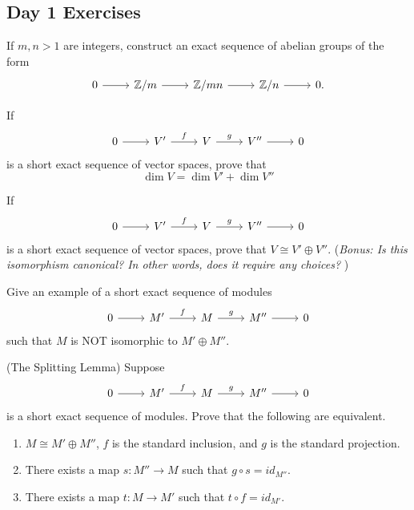 \subsection{Day 1 Exercises}
\begin{exercise}{}{} If $m,n>1$ are integers, construct an exact sequence of abelian groups of the form
\[\begin{tikzcd}
0 \ar[r] & \mathbb{Z}/m \ar[r] & \mathbb{Z}/mn \ar[r] & \mathbb{Z}/n \ar[r] & 0.
\end{tikzcd} \]
\end{exercise}
\begin{exercise}{}{} 
    If 
    \[ \begin{tikzcd}
        0 \ar[r] & V' \ar[r,"f"] & V \ar[r,"g"] & V'' \ar[r] & 0
    \end{tikzcd}\]
    is a short exact sequence of vector spaces, prove that 
    \[
    \dim V = \dim V' + \dim V''
    \]
\end{exercise}
\begin{exercise}{}{} 
    If 
    \[ \begin{tikzcd}
        0 \ar[r] & V' \ar[r,"f"] & V \ar[r,"g"] & V'' \ar[r] & 0
    \end{tikzcd}\]
    is a short exact sequence of vector spaces, prove that $V \cong V' \oplus V''$. ({\it Bonus: Is this isomorphism canonical? In other words, does it require any choices? })\end{exercise}
    \begin{exercise}{}{} 
    Give an example of a short exact sequence of modules
    \[ \begin{tikzcd}
        0 \ar[r] & M' \ar[r,"f"] & M \ar[r,"g"] & M'' \ar[r] & 0
    \end{tikzcd}\]
    such that $M$ is NOT isomorphic to $M' \oplus M''$. 
\end{exercise}
\begin{exercise}{}{} (The Splitting Lemma)
    Suppose     
    \[ \begin{tikzcd}
        0 \ar[r] & M' \ar[r,"f"] & M \ar[r,"g"] & M'' \ar[r] & 0
    \end{tikzcd}\]
    is a short exact sequence of modules. Prove that the following are equivalent.
    \begin{enumerate}
        \item $M \cong M' \oplus M''$, $f$ is the standard inclusion, and $g$ is the standard projection.
        \item There exists a map $s:M'' \to M$ such that $g \circ s = id_{M''}$.
        \item There exists a map $t:M \to M'$ such that $t \circ f = id_{M'}$.
    \end{enumerate}
\end{exercise}
